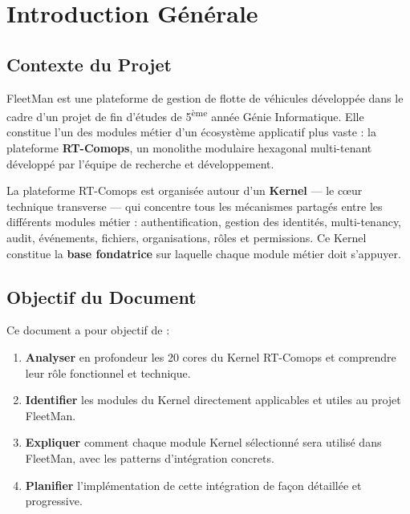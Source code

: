 \documentclass[12pt,a4paper]{report}
\begin{document}
\chapter*{Introduction Générale}
\thispagestyle{fancy}

\section*{Contexte du Projet}

FleetMan est une plateforme de gestion de flotte de véhicules développée dans le cadre d'un projet de fin d'études de 5\textsuperscript{ème} année Génie Informatique. Elle constitue l'un des modules métier d'un écosystème applicatif plus vaste : la plateforme \textbf{RT-Comops}, un monolithe modulaire hexagonal multi-tenant développé par l'équipe de recherche et développement.

La plateforme RT-Comops est organisée autour d'un \textbf{Kernel} — le cœur technique transverse — qui concentre tous les mécanismes partagés entre les différents modules métier : authentification, gestion des identités, multi-tenancy, audit, événements, fichiers, organisations, rôles et permissions. Ce Kernel constitue la \textbf{base fondatrice} sur laquelle chaque module métier doit s'appuyer.

\section*{Objectif du Document}

Ce document a pour objectif de :

\begin{enumerate}[leftmargin=2cm]
  \item \textbf{Analyser} en profondeur les 20 cores du Kernel RT-Comops et comprendre leur rôle fonctionnel et technique.
  \item \textbf{Identifier} les modules du Kernel directement applicables et utiles au projet FleetMan.
  \item \textbf{Expliquer} comment chaque module Kernel sélectionné sera utilisé dans FleetMan, avec les patterns d'intégration concrets.
  \item \textbf{Planifier} l'implémentation de cette intégration de façon détaillée et progressive.
\end{enumerate}
\end{document}
